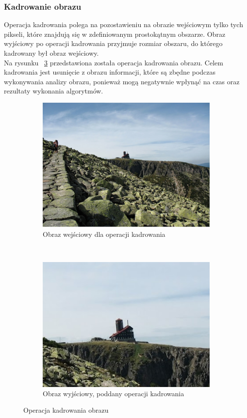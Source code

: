 \subsubsection{Kadrowanie obrazu}
Operacja kadrowania polega na pozostawieniu na obrazie wejściowym tylko tych pikseli, które znajdują się w zdefiniowanym prostokątnym obszarze. Obraz wyjściowy po operacji kadrowania przyjmuje rozmiar obszaru, do którego kadrowany był obraz wejściowy.\\
Na rysunku ~\ref{fig:crop_image} przedstawiona została operacja kadrowania obrazu. Celem kadrowania jest usunięcie z obrazu informacji, które są zbędne podczas wykonywania analizy obrazu, ponieważ mogą negatywnie wpłynąć na czas oraz rezultaty wykonania algorytmów.
\begin{figure}
  \centering
  \begin{subfigure}[b]{0.45\textwidth}
    \includegraphics[width=\textwidth]{img/crop-image-before}
    \caption{Obraz wejściowy dla operacji kadrowania}
    \label{fig:crop_image_before}
  \end{subfigure}
  ~
  \begin{subfigure}[b]{0.45\textwidth}
    \includegraphics[width=\textwidth]{img/crop-image-after}
    \caption{Obraz wyjściowy, poddany operacji kadrowania}
    \label{fig:crop_image_after}
  \end{subfigure}
  \caption{Operacja kadrowania obrazu}\label{fig:crop_image}
\end{figure}
